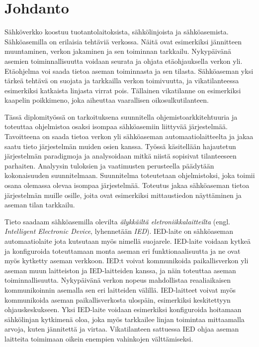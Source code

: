 \chapter{Johdanto}
\label{ch:johdanto}


Sähköverkko koostuu tuotantolaitoksista, sähkölinjoista ja sähköasemista. Sähköasemilla on erilaisia tehtäviä verkossa. Näitä ovat esimerkiksi jännitteen muuntaminen, verkon jakaminen ja sen toiminnan tarkkailu. Nykypäivänä asemien toiminnallisuutta voidaan seurata ja ohjata etäohjauksella verkon yli. Etäohjelma voi saada tietoa aseman toiminnasta ja sen tilasta. Sähköaseman yksi tärkeä tehtävä on suojata ja tarkkailla verkon toimivuutta, ja vikatilanteessa esimerkiksi katkaista linjasta virrat pois. Tällainen vikatilanne on esimerkiksi kaapelin poikkimeno, joka aiheuttaa vaarallisen oikosulkutilanteen.

Tässä diplomityössä on tarkoituksena suunnitella ohjemistoarkkitehtuuria ja toteuttaa ohjelmistoa osaksi isompaa sähköasemiin liittyvää järjestelmää. Tavoitteena on saada tietoa verkon yli sähköaseman automaatiolaitteelta ja jakaa saatu tieto järjestelmän muiden osien kanssa. Työssä käsitellään hajautetun järjestelmän paradigmoja ja analysoidaan mitkä niistä sopisivat tilanteeseen parhaiten. Analyysin tuloksien ja vaatimusten perusteella päädytään kokonaisuuden suunnitelmaan. Suunnitelma toteutetaan ohjelmistoksi, joka toimii osana olemassa olevaa isompaa järjestelmää. Toteutus jakaa sähköaseman tietoa järjestelmän muille osille, joita ovat esimerkiksi mittaustiedon näyttäminen ja aseman tilan tarkkailu.

Tieto saadaam sähköasemilla olevilta \emph{älykkäiltä eletroniikkalaitteilta} (engl. \emph{Intelligent Electronic Device}, lyhennetään \emph{IED}). IED-laite on sähköaseman automaatiolaite jota kutsutaan myös nimellä suojarele. IED-laite voidaan kytkeä ja konfiguroida toteuttamaan monta aseman eri funktionaalisuutta ja ne ovat myös kytketty aseman verkkoon. IED:t voivat kommunikoida paikallisverkon yli aseman muun laitteiston ja IED-laitteiden kanssa, ja näin toteuttaa aseman toiminnallisuutta. Nykypäivänä verkon nopeus mahdollistaa reaaliaikaisen kommunikoinnin asemalla sen eri laitteiden välillä. IED-laitteet voivat myös kommunikoida aseman paikallisverkosta ulospäin, esimerkiksi keskitettyyn ohjauskeskukseen. Yksi IED-laite voidaan esimerkiksi konfiguroida hoitamaan sähkölinjan kytkimenä oloa, joka myös tarkkailee linjan toimintaa mittaamalla arvoja, kuten jännitettä ja virtaa. Vikatilanteen sattuessa IED ohjaa aseman laitteita toimimaan oikein enempien vahinkojen välttämiseksi. \cite{Brunner2008}

